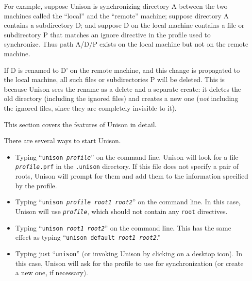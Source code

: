 \documentclass{article}
\newcommand{\NT}[1]{\textit{#1}}
\begin{document}
\begin{itemize}
For example, suppose Unison is synchronizing directory A between the two
machines called the ``local'' and the ``remote'' machine; suppose directory
A contains a subdirectory D; and suppose D on the local machine contains a
file or subdirectory P that matches an ignore directive in the profile used
to synchronize. Thus path A/D/P exists on the local machine but not on the
remote machine.
                                                                                
 If D is renamed to D' on the remote machine, and this change is                
 propagated to the local machine, all such files or subdirectories P            
 will be deleted.  This is because Unison sees the rename as a delete and a
 separate create: it deletes the old directory (including the ignored files)
 and creates a new one ({\em not} including the ignored files, since they
 are completely invisible to it).
\end{itemize}




This section covers the features of Unison in detail.  


There are several ways to start Unison.
\begin{itemize}
\item Typing ``{\tt unison \NT{profile}}'' on the command line.  Unison
will look for a file \texttt{\NT{profile}.prf} in the \verb|.unison|
directory.  If this file does not specify a pair of roots, Unison will
prompt for them and add them to the information specified by the profile.
\item Typing ``{\tt unison \NT{profile} \NT{root1} \NT{root2}}'' on the command
line.
In this case, Unison will use {\tt \NT{profile}}, which should not contain
any {\tt root} directives.
\item Typing ``{\tt unison \NT{root1} \NT{root2}}'' on the command line.  This
has the same effect as typing ``{\tt unison default \NT{root1} \NT{root2}}.''
\item Typing just ``{\tt unison}'' (or invoking Unison by clicking on
a desktop icon).  In this case, Unison will ask for the profile to use
for synchronization (or create a new one, if necessary).   
\end{itemize}

\end{document}
